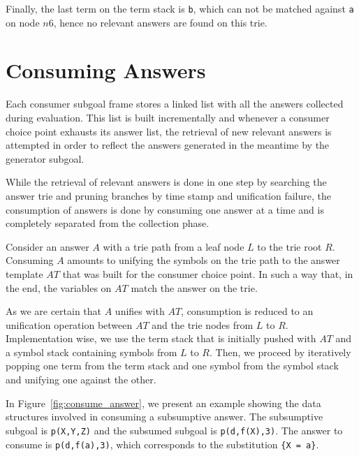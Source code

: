 Finally, the last term on the term stack is \texttt{b}, which
can not be matched against \texttt{a} on node $n6$, hence no
relevant answers are found on this trie.

\section{Consuming Answers}

Each consumer subgoal frame stores a linked list with all the answers collected
during evaluation. This list is built incrementally and
whenever a consumer choice point exhausts its answer list, the retrieval
of new relevant answers is attempted in order to reflect the answers generated in the meantime
by the generator subgoal.

While the retrieval of relevant answers is done in one step by searching the answer trie
and pruning branches by time stamp and unification failure, the consumption of
answers is done by consuming one answer at a time and is completely separated from the collection phase.

Consider an answer $A$ with a trie path from a leaf node $L$ to
the trie root $R$. Consuming $A$ amounts to unifying the symbols on the trie path
to the answer template $AT$ that was built for the consumer choice point. In such a way that, in the end,
the variables on $AT$ match the answer on the trie.

As we are certain that $A$ unifies with $AT$, consumption is reduced to an unification operation
between $AT$ and the trie nodes from $L$ to $R$.
Implementation wise, we use the term stack that is initially pushed with $AT$
and a symbol stack containing symbols from $L$ to $R$. Then, we proceed by
iteratively popping one term from the term stack and one symbol from the symbol stack
and unifying one against the other.

In Figure~\ref{fig:consume_answer}, we present an example showing the data structures involved in consuming
a subsumptive answer. The subsumptive subgoal is \texttt{p(X,Y,Z)} and the
subsumed subgoal is \texttt{p(d,f(X),3)}. The answer to consume is \texttt{p(d,f(a),3)},
which corresponds to the substitution \texttt{\{X~=~a\}}.

